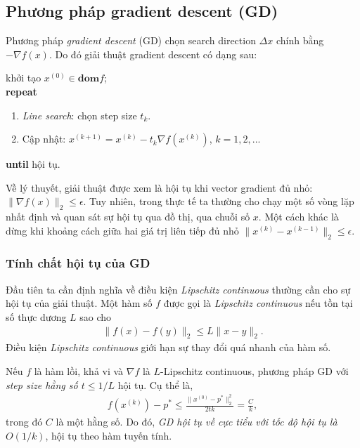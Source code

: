 \documentclass{book}
\begin{document}
\subsection{Phương pháp gradient descent (GD)}
Phương pháp \emph{gradient descent} (GD) chọn search direction $\Delta x$ chính bằng $-\nabla f(x)$. Do đó giải thuật gradient descent có dạng sau:
\begin{algorithm}[H]
khởi tạo $x^{(0)} \in \mathbf{dom}f$;\\
\textbf{repeat} 
\begin{enumerate}
\item \emph{Line search}: chọn step size $t_k$.
\item Cập nhật: $x^{(k+1)} = x^{(k)} - t_k \nabla f(x^{(k)})$, $k=1,2,...$
\end{enumerate}
\textbf{until} hội tụ. 
\caption{Giải thuật gradient descent.}
\label{alg:gd}
\end{algorithm}

Về lý thuyết, giải thuật được xem là hội tụ khi vector gradient đủ nhỏ: $\| \nabla f(x) \|_2 \leq \epsilon$.
Tuy nhiên, trong thực tế ta thường cho chạy một số vòng lặp nhất định và quan sát sự hội tụ qua đồ thị, qua chuỗi số $x$. Một cách khác là dừng khi khoảng cách giữa hai giá trị liên tiếp đủ nhỏ $\|x^{(k)} - x^{(k-1)}\|_2 \leq \epsilon$.

\subsubsection*{Tính chất hội tụ của GD}
Đầu tiên ta cần định nghĩa về điều kiện \emph{Lipschitz continuous} thường cần cho sự hội tụ của giải thuật.
Một hàm số $f$ được gọi là \emph{Lipschitz continuous} nếu tồn tại số thực dương $L$ sao cho
\begin{align}
\|f(x) - f(y) \|_2 \leq L \|x-y\|_2.
\end{align}
Điều kiện \emph{Lipschitz continuous} giới hạn sự thay đổi quá nhanh của hàm số.

Nếu $f$ là hàm lồi, khả vi và $\nabla f$ là $L$-Lipschitz continuous, phương pháp GD với \emph{step size hằng số $t \leq 1/L$} hội tụ. Cụ thể là,
\begin{align*}
f(x^{(k)}) - p^* \leq \frac{\|x^{(0)} - p^*\|^2_2}{2tk} = \frac{C}{k},
\end{align*}
trong đó $C$ là một hằng số.
Do đó, \emph{GD hội tụ về cực tiểu với tốc độ hội tụ là $O(1/k)$}, hội tụ theo hàm tuyến tính.
\end{document}
